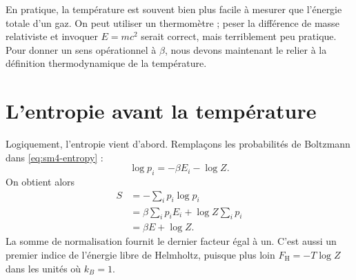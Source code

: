 \begin{classroomqa}
\end{classroomqa}

En pratique, la température est souvent bien plus facile à mesurer que l’énergie totale d’un gaz. On peut utiliser un thermomètre ; peser la différence de masse relativiste et invoquer \(E=mc^2\) serait correct, mais terriblement peu pratique. Pour donner un sens opérationnel à \(\beta\), nous devons maintenant le relier à la définition thermodynamique de la température.

\section{L’entropie avant la température}

Logiquement, l’entropie vient d’abord. Remplaçons les probabilités de Boltzmann dans \eqref{eq:sm4-entropy} :
\begin{equation}
 \log p_i=-\beta E_i-\log Z.
\end{equation}
On obtient alors
\begin{align}
 S
 &=-\sum_i p_i\log p_i\\
 &=\beta\sum_i p_iE_i+\log Z\sum_i p_i\\
 &=\beta E+\log Z.
 \label{eq:sm4-entropy-logz}
\end{align}
La somme de normalisation fournit le dernier facteur égal à un. C’est aussi un premier indice de l’énergie libre de Helmholtz, puisque plus loin \(F_{\mathrm H}=-T\log Z\) dans les unités où \(k_B=1\).

\begin{classroomqa}
\end{classroomqa}

\begin{classroomqa}
\end{classroomqa}

